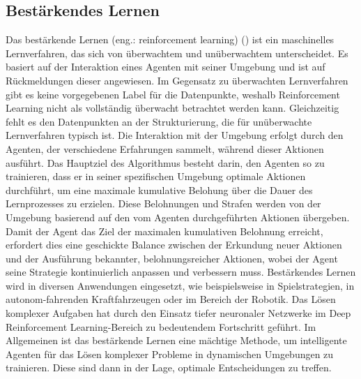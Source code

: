 \subsection{Bestärkendes Lernen}
Das bestärkende Lernen (eng.: reinforcement learning) (\cite[S. 13 ff.]{lorenz_reinforcement_2020}) ist ein maschinelles Lernverfahren, das sich von überwachtem und unüberwachtem unterscheidet. Es basiert auf der Interaktion eines Agenten mit seiner Umgebung und ist auf Rückmeldungen dieser angewiesen. Im Gegensatz zu überwachten Lernverfahren gibt es keine vorgegebenen Label für die Datenpunkte, weshalb Reinforcement Learning nicht als vollständig überwacht betrachtet werden kann. Gleichzeitig fehlt es den Datenpunkten an der Strukturierung, die für unüberwachte Lernverfahren typisch ist. Die Interaktion mit der Umgebung erfolgt durch den Agenten, der verschiedene Erfahrungen sammelt, während dieser Aktionen ausführt. Das Hauptziel des Algorithmus besteht darin, den Agenten so zu trainieren, dass er in seiner spezifischen Umgebung optimale Aktionen durchführt, um eine maximale kumulative Belohung über die Dauer des Lernprozesses zu erzielen. Diese Belohnungen und Strafen werden von der Umgebung basierend auf den vom Agenten durchgeführten Aktionen übergeben. Damit der Agent das Ziel der maximalen kumulativen Belohnung erreicht, erfordert dies eine geschickte Balance zwischen der Erkundung neuer Aktionen und der Ausführung bekannter, belohnungsreicher Aktionen, wobei der Agent seine Strategie kontinuierlich anpassen und verbessern muss. Bestärkendes Lernen wird in diversen Anwendungen eingesetzt, wie beispielsweise in Spielstrategien, in autonom-fahrenden Kraftfahrzeugen oder im Bereich der Robotik. Das Lösen komplexer Aufgaben hat durch den Einsatz tiefer neuronaler Netzwerke im \glqq Deep Reinforcement Learning\grqq{}-Bereich zu bedeutendem Fortschritt geführt. Im Allgemeinen ist das bestärkende Lernen eine mächtige Methode, um intelligente Agenten für das Lösen komplexer Probleme in dynamischen Umgebungen zu trainieren. Diese sind dann in der Lage, optimale Entscheidungen zu treffen.

